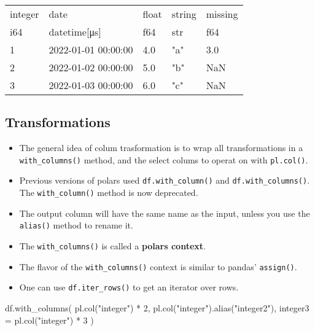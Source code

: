\documentclass[
  letterpaper,
  DIV=11,
  numbers=noendperiod]{scrartcl}
\newenvironment{Shaded}{\begin{snugshade}}{\end{snugshade}}
\newcommand{\DecValTok}[1]{\textcolor[rgb]{0.68,0.00,0.00}{#1}}
\newcommand{\NormalTok}[1]{\textcolor[rgb]{0.00,0.23,0.31}{#1}}
\newcommand{\OperatorTok}[1]{\textcolor[rgb]{0.37,0.37,0.37}{#1}}
\newcommand{\StringTok}[1]{\textcolor[rgb]{0.13,0.47,0.30}{#1}}
\providecommand{\tightlist}{%
  \setlength{\itemsep}{0pt}\setlength{\parskip}{0pt}}\usepackage{longtable,booktabs,array}
\begin{document}
\begin{longtable}[]{@{}lllll@{}}
\toprule()
integer & date & float & string & missing \\
i64 & datetime{[}μs{]} & f64 & str & f64 \\
\midrule()
\endhead
1 & 2022-01-01 00:00:00 & 4.0 & "a" & 3.0 \\
2 & 2022-01-02 00:00:00 & 5.0 & "b" & NaN \\
3 & 2022-01-03 00:00:00 & 6.0 & "c" & NaN \\
\bottomrule()
\end{longtable}

\hypertarget{transformations}{%
\subsection{Transformations}\label{transformations}}

\begin{itemize}
\tightlist
\item
  The general idea of colum trasformation is to wrap all transformations
  in a \texttt{with\_columns()} method, and the select colums to operat
  on with \texttt{pl.col()}.
\item
  Previous versions of polars used \texttt{df.with\_column()} and
  \texttt{df.with\_columns()}. The \texttt{with\_column()} method is now
  deprecated.
\item
  The output column will have the same name as the input, unless you use
  the \texttt{alias()} method to rename it.
\item
  The \texttt{with\_columns()} is called a \textbf{polars context}.
\item
  The flavor of the \texttt{with\_columns()} context is similar to
  pandas' \texttt{assign()}.
\item
  One can use \texttt{df.iter\_rows()} to get an iterator over rows.
\end{itemize}

\begin{Shaded}
\begin{Highlighting}[]
\NormalTok{df.with\_columns(}
\NormalTok{    pl.col(}\StringTok{"integer"}\NormalTok{) }\OperatorTok{*} \DecValTok{2}\NormalTok{,}
\NormalTok{    pl.col(}\StringTok{"integer"}\NormalTok{).alias(}\StringTok{"integer2"}\NormalTok{),}
\NormalTok{    integer3 }\OperatorTok{=}\NormalTok{ pl.col(}\StringTok{"integer"}\NormalTok{) }\OperatorTok{*} \DecValTok{3}
\NormalTok{)}
\end{Highlighting}
\end{Shaded}
\end{document}
